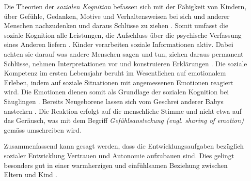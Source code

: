 Die Theorien der \textit{sozialen Kognition} befassen sich mit der Fähigkeit von Kindern, über Gefühle, Gedanken, Motive und Verhaltensweisen bei sich und anderer Menschen nachzudenken und daraus Schlüsse zu ziehen \cite[S.~486ff]{Siegler2008}. Somit umfasst die soziale Kognition alle Leistungen, die Aufschluss über die psychische Verfassung eines Anderen liefern \cite[S.~237ff]{Bischof2011}. Kinder verarbeiten soziale Informationen aktiv. Dabei achten sie darauf was andere Menschen sagen und tun, ziehen daraus permanent Schlüsse, nehmen Interpretationen vor und konstruieren Erklärungen \cite{Siegler2008}. Die soziale Kompetenz im ersten Lebensjahr beruht im Wesentlichen auf emotionalem Erleben, indem auf soziale Situationen mit angemessenen Emotionen reagiert wird. Die Emotionen dienen somit als Grundlage der sozialen Kognition bei Säuglingen \cite{Bischof2011}. Bereits Neugeborene lassen sich vom Geschrei anderer Babys anstecken \cite{Simner1971}. Die Reaktion erfolgt auf die menschliche Stimme und nicht etwa auf das Geräusch, was mit dem Begriff \textit{Gefühlsansteckung (engl. sharing of emotion)} gemäss  umschreiben wird.

Zusammenfassend kann gesagt werden, dass die Entwicklungsaufgaben bezüglich sozialer Entwicklung Vertrauen und Autonomie aufzubauen sind. Dies gelingt besonders gut in einer warmherzigen und einfühlsamen Beziehung zwischen Eltern und Kind \cite[S.~224]{Berk2011}.

